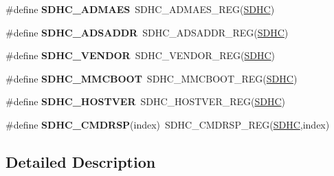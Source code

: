 \begin{DoxyCompactItemize}
\item 
\#define {\bfseries S\+D\+H\+C\+\_\+\+A\+D\+M\+A\+ES}~S\+D\+H\+C\+\_\+\+A\+D\+M\+A\+E\+S\+\_\+\+R\+EG(\hyperlink{group__SDHC__Peripheral__Access__Layer_gadfa975565f8f38eb596ca3ed92df30c8}{S\+D\+HC})\hypertarget{group__SDHC__Register__Accessor__Macros_ga5be4dc6719f7668336f9520188deab12}{}\label{group__SDHC__Register__Accessor__Macros_ga5be4dc6719f7668336f9520188deab12}

\item 
\#define {\bfseries S\+D\+H\+C\+\_\+\+A\+D\+S\+A\+D\+DR}~S\+D\+H\+C\+\_\+\+A\+D\+S\+A\+D\+D\+R\+\_\+\+R\+EG(\hyperlink{group__SDHC__Peripheral__Access__Layer_gadfa975565f8f38eb596ca3ed92df30c8}{S\+D\+HC})\hypertarget{group__SDHC__Register__Accessor__Macros_ga907484b9ccf32689f1a11cac33ea11ae}{}\label{group__SDHC__Register__Accessor__Macros_ga907484b9ccf32689f1a11cac33ea11ae}

\item 
\#define {\bfseries S\+D\+H\+C\+\_\+\+V\+E\+N\+D\+OR}~S\+D\+H\+C\+\_\+\+V\+E\+N\+D\+O\+R\+\_\+\+R\+EG(\hyperlink{group__SDHC__Peripheral__Access__Layer_gadfa975565f8f38eb596ca3ed92df30c8}{S\+D\+HC})\hypertarget{group__SDHC__Register__Accessor__Macros_gaaf024249eb7cb999b4870dae0d6116e0}{}\label{group__SDHC__Register__Accessor__Macros_gaaf024249eb7cb999b4870dae0d6116e0}

\item 
\#define {\bfseries S\+D\+H\+C\+\_\+\+M\+M\+C\+B\+O\+OT}~S\+D\+H\+C\+\_\+\+M\+M\+C\+B\+O\+O\+T\+\_\+\+R\+EG(\hyperlink{group__SDHC__Peripheral__Access__Layer_gadfa975565f8f38eb596ca3ed92df30c8}{S\+D\+HC})\hypertarget{group__SDHC__Register__Accessor__Macros_gab4dff4aeb9392aabdb6f9e6dcf136428}{}\label{group__SDHC__Register__Accessor__Macros_gab4dff4aeb9392aabdb6f9e6dcf136428}

\item 
\#define {\bfseries S\+D\+H\+C\+\_\+\+H\+O\+S\+T\+V\+ER}~S\+D\+H\+C\+\_\+\+H\+O\+S\+T\+V\+E\+R\+\_\+\+R\+EG(\hyperlink{group__SDHC__Peripheral__Access__Layer_gadfa975565f8f38eb596ca3ed92df30c8}{S\+D\+HC})\hypertarget{group__SDHC__Register__Accessor__Macros_ga8a0985af9c573c7c102c0e8d61d525ad}{}\label{group__SDHC__Register__Accessor__Macros_ga8a0985af9c573c7c102c0e8d61d525ad}

\item 
\#define {\bfseries S\+D\+H\+C\+\_\+\+C\+M\+D\+R\+SP}(index)~S\+D\+H\+C\+\_\+\+C\+M\+D\+R\+S\+P\+\_\+\+R\+EG(\hyperlink{group__SDHC__Peripheral__Access__Layer_gadfa975565f8f38eb596ca3ed92df30c8}{S\+D\+HC},index)\hypertarget{group__SDHC__Register__Accessor__Macros_ga1f607aef5b63cbb799f84e096e637997}{}\label{group__SDHC__Register__Accessor__Macros_ga1f607aef5b63cbb799f84e096e637997}

\end{DoxyCompactItemize}


\subsection{Detailed Description}
